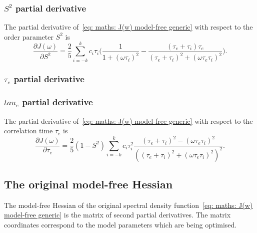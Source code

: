 \subsubsection{$S^2$ partial derivative}

The partial derivative of~\eqref{eq: maths: J(w) model-free generic} with respect to the order parameter $S^2$ is
\begin{equation}
    \frac{\partial J(\omega)}{\partial S^2} = \frac{2}{5} \sum_{i=-k}^k c_i \tau_i \Bigg(
        \frac{1}{1 + (\omega \tau_i)^2}
        - \frac{(\tau_e + \tau_i)\tau_e}{(\tau_e + \tau_i)^2 + (\omega \tau_e \tau_i)^2}
    \Bigg).
\end{equation}



\begin{latexonly}
    \subsubsection{$\tau_e$ partial derivative}
\end{latexonly}
\begin{htmlonly}
    \subsubsection{$tau_e$ partial derivative}
\end{htmlonly}

The partial derivative of~\eqref{eq: maths: J(w) model-free generic} with respect to the correlation time $\tau_e$ is
\begin{equation}
    \frac{\partial J(\omega)}{\partial \tau_e} = \frac{2}{5} (1 - S^2) \sum_{i=-k}^k c_i \tau_i^2
        \frac{(\tau_e + \tau_i)^2 - (\omega \tau_e \tau_i)^2}{\left((\tau_e + \tau_i)^2 + (\omega \tau_e \tau_i)^2 \right)^2}.
\end{equation}




\newpage
\subsection{The original model-free Hessian}

The model-free Hessian of the original spectral density function~\eqref{eq: maths: J(w) model-free generic} is the matrix of second partial derivatives.
The matrix coordinates correspond to the model parameters which are being optimised.



